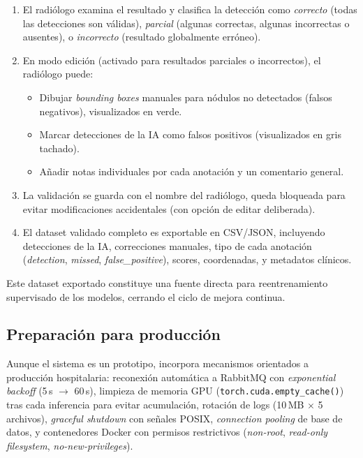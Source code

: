 \documentclass[conference]{IEEEtran}
\begin{document}
\begin{enumerate}
\item El radi\'{o}logo examina el resultado y clasifica la detecci\'{o}n como
\textit{correcto} (todas las detecciones son v\'{a}lidas),
\textit{parcial} (algunas correctas, algunas incorrectas o ausentes), o
\textit{incorrecto} (resultado globalmente err\'{o}neo).
\item En modo edici\'{o}n (activado para resultados parciales o incorrectos),
el radi\'{o}logo puede:
\begin{itemize}
\item Dibujar \textit{bounding boxes} manuales para n\'{o}dulos no detectados
(falsos negativos), visualizados en verde.
\item Marcar detecciones de la IA como falsos positivos (visualizados en gris
tachado).
\item A\~{n}adir notas individuales por cada anotaci\'{o}n y un comentario
general.
\end{itemize}
\item La validaci\'{o}n se guarda con el nombre del radi\'{o}logo, queda
bloqueada para evitar modificaciones accidentales (con opci\'{o}n de editar
deliberada).
\item El dataset validado completo es exportable en CSV/JSON, incluyendo
detecciones de la IA, correcciones manuales, tipo de cada anotaci\'{o}n
(\textit{detection}, \textit{missed}, \textit{false\_positive}), scores,
coordenadas, y metadatos cl\'{i}nicos.
\end{enumerate}

Este dataset exportado constituye una fuente directa para reentrenamiento
supervisado de los modelos, cerrando el ciclo de mejora continua.


\subsection{Preparaci\'{o}n para producci\'{o}n}

Aunque el sistema es un prototipo, incorpora mecanismos orientados a
producci\'{o}n hospitalaria: reconexi\'{o}n autom\'{a}tica a RabbitMQ con
\textit{exponential backoff} (5\,s $\rightarrow$ 60\,s), limpieza de memoria
GPU (\texttt{torch.cuda.empty\_cache()}) tras cada inferencia para evitar
acumulaci\'{o}n, rotaci\'{o}n de logs (10\,MB $\times$ 5 archivos),
\textit{graceful shutdown} con se\~{n}ales POSIX, \textit{connection pooling}
de base de datos, y contenedores Docker con permisos restrictivos
(\textit{non-root}, \textit{read-only filesystem}, \textit{no-new-privileges}).
\end{document}

